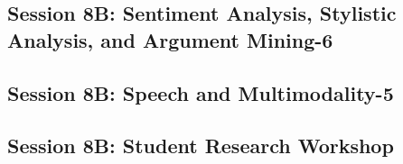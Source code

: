 \subsection{\large Session 8B: Sentiment Analysis, Stylistic Analysis, and Argument Mining-6}
\label{parallel-session-8B-trackH}
\TrackHLoc\hfill\sessionchair{}{}
\clearpage
\subsection{\large Session 8B: Speech and Multimodality-5}
\label{parallel-session-8B-trackI}
\TrackILoc\hfill\sessionchair{}{}
\clearpage
\subsection{\large Session 8B: Student Research Workshop}
\label{parallel-session-8B-trackJ}
\TrackJLoc\hfill\sessionchair{}{}
\clearpage


